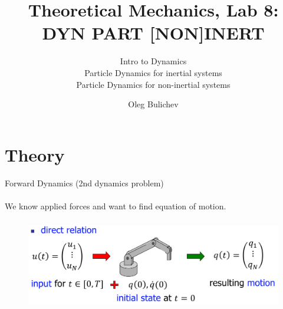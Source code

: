 \documentclass[aspectratio=169]{beamer}
\title[Theoretical Mechanics]{Theoretical Mechanics, Lab 8: DYN PART [NON]INERT} %
\subtitle{Intro to Dynamics
\\ Particle Dynamics for inertial systems \\ Particle Dynamics for non-inertial systems 
         } %
\author{Oleg Bulichev}
\newcommand{\fbckg}[1]{\usebackgroundtemplate{\texttt{[image: \#1]}}}%
\begin{document}
\setlength{\abovedisplayskip}{0pt}
\setlength{\belowdisplayskip}{0pt}
\setlength{\abovedisplayshortskip}{0pt}
\setlength{\belowdisplayshortskip}{0pt}

\fbckg{fibeamer/figs/title_page.png}

\fbckg{fibeamer/figs/common.png}


\section*{Theory}

\begin{frame}[t]{Forward Dynamics  (2nd dynamics problem)}
\framesubtitle{}
    We know applied forces and want to find equation of motion.
    \begin{figure}[H]
        \centering\includegraphics[height=4cm,width=1\textwidth,keepaspectratio]{forward_dynamics.png}
        \label{fig:forward_dynamics.png}
    \end{figure}
\end{frame}
\end{document}
